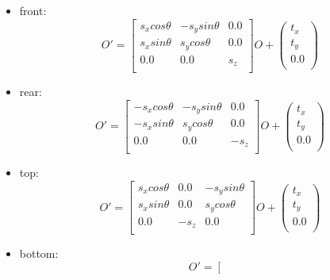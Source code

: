 \begin{itemize}
\item front:\\
\begin{equation}
O'=\left[\begin{array}{ccc}
s_xcos\theta&-s_ysin\theta&0.0\\
s_xsin\theta&s_ycos\theta&0.0\\
0.0&0.0&s_z\\
\end{array}
\right]O+\left(
\begin{array}{c}
t_x\\
t_y\\
0.0\\
\end{array}\right)
\end{equation}
\item rear:\\
\begin{equation}
O'=\left[\begin{array}{ccc}
-s_xcos\theta&-s_ysin\theta&0.0\\
-s_xsin\theta&s_ycos\theta&0.0\\
0.0&0.0&-s_z\\
\end{array}
\right]O+\left(
\begin{array}{c}
t_x\\
t_y\\
0.0\\
\end{array}\right)
\end{equation}
\item top:\\
\begin{equation}
O'=\left[\begin{array}{ccc}
s_xcos\theta&0.0&-s_ysin\theta\\
s_xsin\theta&0.0&s_ycos\theta\\
0.0&-s_z&0.0\\
\end{array}
\right]O+\left(
\begin{array}{c}
t_x\\
t_y\\
0.0\\
\end{array}\right)
\end{equation}
\item bottom:\\
\begin{equation}
O'=\left[\begin{array}{ccc}

\end{array}
\end{equation}
\end{itemize}
